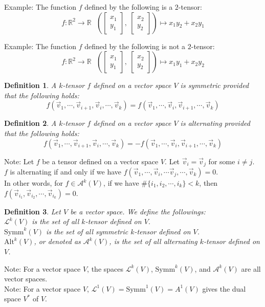 \documentclass[11pt,oneside]{book}
\theoremstyle{break}
\theoremstyle{break}
\newtheorem{defn}{Definition}[corL]
\newcommand{\R}{\mathbb{R}}
\newcommand{\Lt}{\mathcal{L}}
\newcommand{\A}{\mathcal{A}}
\newcommand{\Symm}{\text{Symm}}
\newcommand{\Alt}{\text{Alt}}
\newcommand{\lr}[1]{\left(#1\right)}
\newcommand{\bmat}[1]{\begin{bmatrix} #1 \end{bmatrix}}
\newcommand{\note}{\color{red}Note: \color{black}}
\newcommand{\example}{\color{green}Example: \color{black}}
\begin{document}
\example The function $f$ defined by the following is a $2$-tensor: 
$$f:\R^2 \to \R \ \ \ \lr{\bmat{x_1\\y_1},\ \bmat{x_2\\ y_2}}\mapsto x_1y_2+x_2y_1$$

\example The function $f$ defined by the following is not a $2$-tensor: 
$$f:\R^2 \to \R \ \ \ \lr{\bmat{x_1\\y_1},\ \bmat{x_2\\ y_2}}\mapsto x_1y_1+x_2y_2$$

\begin{defn}
A $k$-tensor $f$ defined on a vector space $V$ is symmetric provided that the following holds:
$$f(\vec{v}_1,\cdots, \vec{v}_{i+1}, \vec{v}_i,\cdots, \vec{v}_k) = f(\vec{v}_1,\cdots, \vec{v}_{i}, \vec{v}_{i+1},\cdots, \vec{v}_k) $$ 
\end{defn}

\begin{defn}
A $k$-tensor $f$ defined on a vector space $V$ is alternating provided that the following holds:
$$f(\vec{v}_1,\cdots, \vec{v}_{i+1}, \vec{v}_i,\cdots, \vec{v}_k) = -f(\vec{v}_1,\cdots, \vec{v}_{i}, \vec{v}_{i+1},\cdots, \vec{v}_k) $$ 
\end{defn}

\note Let $f$ be a tensor defined on a vector space $V$. Let $\vec{v}_i = \vec{v}_j$ for some $i \neq j$. \\
$f$ is alternating if and only if we have $f(\vec{v}_1,\cdots, \vec{v}_{i}, \cdots \vec{v}_{j},\cdots, \vec{v}_k) = 0$.\\ 
In other words, for $f \in \A^k(V)$, if we have $\#\{ i_1,i_2,\cdots, i_k\} < k$, then $f(\vec{v}_{i_1},\vec{v}_{i_2}, \cdots, \vec{v}_{i_k}) = 0$. 

\begin{defn}
Let $V$ be a vector space. We define the followings:\\
$\Lt^k(V)$ is the set of all $k$-tensor defined on $V$.\\
$\Symm^k(V)$ is the set of all symmetric $k$-tensor defined on $V$.\\
$\Alt^k(V)$, or denoted as $\A^k(V)$, is the set of all alternating $k$-tensor defined on $V$.
\end{defn}

\note For a vector space $V$, the spaces $\Lt^k(V)$, $\Symm^k(V)$, and $\A^k(V)$ are all vector spaces.\\ 
\note For a vector space $V$, $\Lt^1(V) = \Symm^1(V) = A^1(V)$ gives the dual space $V^*$ of $V$.\\
\end{document}
